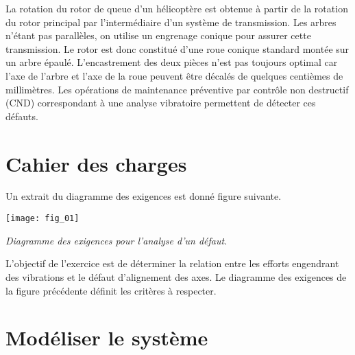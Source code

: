 \ifprof
\else
\begin{multicols}{2}



La rotation du rotor de queue d'un hélicoptère est obtenue à partir de la rotation du rotor principal par l'intermédiaire d'un système de transmission. Les arbres n'étant pas parallèles, on utilise un engrenage conique pour assurer cette transmission. Le rotor est donc constitué d'une roue conique standard montée sur un arbre épaulé. L'encastrement des deux pièces n'est pas toujours optimal car l'axe de l'arbre et l'axe de la roue peuvent être décalés de quelques centièmes de millimètres. 
Les opérations de maintenance préventive par contrôle non destructif (CND) correspondant à une analyse vibratoire permettent de détecter ces défauts.

\section*{Cahier des charges}
Un extrait du diagramme des exigences est donné figure suivante.

\begin{center}
%
\texttt{[image: fig\_01]}

\textit{Diagramme des exigences pour l'analyse d'un défaut.}
\end{center}


\begin{obj}
L'objectif de l'exercice est de déterminer la relation entre les efforts engendrant des vibrations et le défaut d'alignement des axes. Le diagramme des exigences de la figure précédente %
définit les critères à respecter.
\end{obj}

\section*{Modéliser le système\\}

%
%


\end{multicols}
